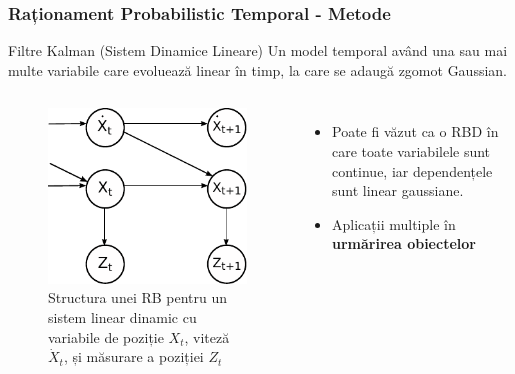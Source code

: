 \begin{frame}[t]
    \frametitle{Raționament Probabilistic Temporal - Metode}
  
  \begin{block}{Filtre Kalman (Sistem Dinamice Lineare)}
	Un model temporal având una sau mai multe variabile care evoluează linear în timp, la care se adaugă 
	\alert{zgomot Gaussian}.
  \end{block}
  
  \begin{columns}[T]
  	\begin{figure}
  		\centering
  		\includegraphics[height=0.35\textheight]{graphics/hmm-intro/kalman/kalman_filter_simple.pdf}
  		\caption{\tiny{Structura unei RB pentru un sistem linear dinamic cu variabile de poziție $X_t$, 
  		viteză $\dot{X}_t$, și măsurare a poziției $Z_t$}}
  	\end{figure}
	  
  	\begin{itemize}
  		\item \footnotesize{Poate fi văzut ca o RBD în care toate variabilele sunt continue, iar dependențele sunt 
  		linear gaussiane.}
  		\item \footnotesize{Aplicații multiple în \textbf{urmărirea obiectelor}}
  	\end{itemize}
  \end{columns}
  
\end{frame}

